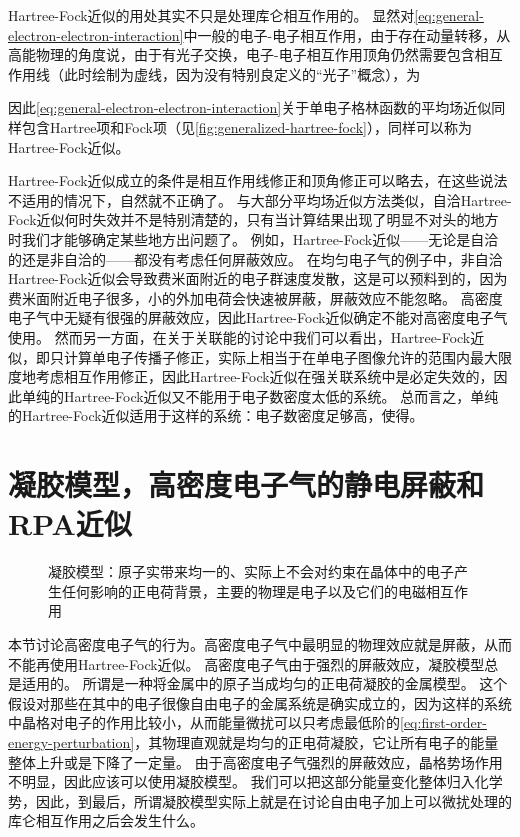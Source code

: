 Hartree-Fock近似的用处其实不只是处理库仑相互作用的。
显然对\eqref{eq:general-electron-electron-interaction}中一般的电子-电子相互作用，由于存在动量转移，从高能物理的角度说，由于有光子交换，电子-电子相互作用顶角仍然需要包含相互作用线（此时绘制为虚线，因为没有特别良定义的“光子”概念），为

因此\eqref{eq:general-electron-electron-interaction}关于单电子格林函数的平均场近似同样包含Hartree项和Fock项（见\autoref{fig:generalized-hartree-fock}），同样可以称为Hartree-Fock近似。

Hartree-Fock近似成立的条件是相互作用线修正和顶角修正可以略去，在这些说法不适用的情况下，自然就不正确了。
与大部分平均场近似方法类似，自洽Hartree-Fock近似何时失效并不是特别清楚的，只有当计算结果出现了明显不对头的地方时我们才能够确定某些地方出问题了。
例如，Hartree-Fock近似——无论是自洽的还是非自洽的——都没有考虑任何屏蔽效应。
在均匀电子气的例子中，非自洽Hartree-Fock近似会导致费米面附近的电子群速度发散，这是可以预料到的，因为费米面附近电子很多，小的外加电荷会快速被屏蔽，屏蔽效应不能忽略。
高密度电子气中无疑有很强的屏蔽效应，因此Hartree-Fock近似确定不能对高密度电子气使用。
然而另一方面，在关于关联能的讨论中我们可以看出，Hartree-Fock近似，即只计算单电子传播子修正，实际上相当于在单电子图像允许的范围内最大限度地考虑相互作用修正，因此Hartree-Fock近似在强关联系统中是必定失效的，因此单纯的Hartree-Fock近似又不能用于电子数密度太低的系统。
总而言之，单纯的Hartree-Fock近似适用于这样的系统：电子数密度足够高，使得。

\section{凝胶模型，高密度电子气的静电屏蔽和RPA近似}\label{sec:high-density}

\begin{figure}
    \centering
    
    \caption{凝胶模型：原子实带来均一的、实际上不会对约束在晶体中的电子产生任何影响的正电荷背景，主要的物理是电子以及它们的电磁相互作用}
\end{figure}

本节讨论高密度电子气的行为。高密度电子气中最明显的物理效应就是屏蔽，从而不能再使用Hartree-Fock近似。
高密度电子气由于强烈的屏蔽效应，凝胶模型总是适用的。
所谓是一种将金属中的原子当成均匀的正电荷凝胶的金属模型。
这个假设对那些在其中的电子很像自由电子的金属系统是确实成立的，因为这样的系统中晶格对电子的作用比较小，从而能量微扰可以只考虑最低阶的\eqref{eq:first-order-energy-perturbation}，其物理直观就是均匀的正电荷凝胶，它让所有电子的能量整体上升或是下降了一定量。
由于高密度电子气强烈的屏蔽效应，晶格势场作用不明显，因此应该可以使用凝胶模型。
我们可以把这部分能量变化整体归入化学势，因此，到最后，所谓凝胶模型实际上就是在讨论自由电子加上可以微扰处理的库仑相互作用之后会发生什么。

